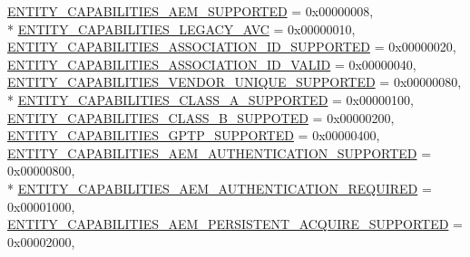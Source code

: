\begin{DoxyCompactItemize}
\hyperlink{namespaceavdecc__lib_a7904f1f7ce9b1358c7158a9dffc7319daa18e66b7496ce73e2596d8f30bb18f40}{E\+N\+T\+I\+T\+Y\+\_\+\+C\+A\+P\+A\+B\+I\+L\+I\+T\+I\+E\+S\+\_\+\+A\+E\+M\+\_\+\+S\+U\+P\+P\+O\+R\+T\+ED} = 0x00000008, 
\\*
\hyperlink{namespaceavdecc__lib_a7904f1f7ce9b1358c7158a9dffc7319da9e2a4da4fdfc17e2be0dd7a47ee6eb32}{E\+N\+T\+I\+T\+Y\+\_\+\+C\+A\+P\+A\+B\+I\+L\+I\+T\+I\+E\+S\+\_\+\+L\+E\+G\+A\+C\+Y\+\_\+\+A\+VC} = 0x00000010, 
\hyperlink{namespaceavdecc__lib_a7904f1f7ce9b1358c7158a9dffc7319daa1ed17e931a0b1bbd2b58ed8a952bb73}{E\+N\+T\+I\+T\+Y\+\_\+\+C\+A\+P\+A\+B\+I\+L\+I\+T\+I\+E\+S\+\_\+\+A\+S\+S\+O\+C\+I\+A\+T\+I\+O\+N\+\_\+\+I\+D\+\_\+\+S\+U\+P\+P\+O\+R\+T\+ED} = 0x00000020, 
\hyperlink{namespaceavdecc__lib_a7904f1f7ce9b1358c7158a9dffc7319daec978ed46b2558f86a7f6e0d454f73c0}{E\+N\+T\+I\+T\+Y\+\_\+\+C\+A\+P\+A\+B\+I\+L\+I\+T\+I\+E\+S\+\_\+\+A\+S\+S\+O\+C\+I\+A\+T\+I\+O\+N\+\_\+\+I\+D\+\_\+\+V\+A\+L\+ID} = 0x00000040, 
\hyperlink{namespaceavdecc__lib_a7904f1f7ce9b1358c7158a9dffc7319da0390d60ea314baff9475942ba1c800e7}{E\+N\+T\+I\+T\+Y\+\_\+\+C\+A\+P\+A\+B\+I\+L\+I\+T\+I\+E\+S\+\_\+\+V\+E\+N\+D\+O\+R\+\_\+\+U\+N\+I\+Q\+U\+E\+\_\+\+S\+U\+P\+P\+O\+R\+T\+ED} = 0x00000080, 
\\*
\hyperlink{namespaceavdecc__lib_a7904f1f7ce9b1358c7158a9dffc7319da9ce10f1cf342140a0bf78429a943abf9}{E\+N\+T\+I\+T\+Y\+\_\+\+C\+A\+P\+A\+B\+I\+L\+I\+T\+I\+E\+S\+\_\+\+C\+L\+A\+S\+S\+\_\+\+A\+\_\+\+S\+U\+P\+P\+O\+R\+T\+ED} = 0x00000100, 
\hyperlink{namespaceavdecc__lib_a7904f1f7ce9b1358c7158a9dffc7319dade0febcf21837d36c15978870251ab8f}{E\+N\+T\+I\+T\+Y\+\_\+\+C\+A\+P\+A\+B\+I\+L\+I\+T\+I\+E\+S\+\_\+\+C\+L\+A\+S\+S\+\_\+\+B\+\_\+\+S\+U\+P\+P\+O\+T\+ED} = 0x00000200, 
\hyperlink{namespaceavdecc__lib_a7904f1f7ce9b1358c7158a9dffc7319da8d1d2cc7b15422d1d05335b60e5bd88b}{E\+N\+T\+I\+T\+Y\+\_\+\+C\+A\+P\+A\+B\+I\+L\+I\+T\+I\+E\+S\+\_\+\+G\+P\+T\+P\+\_\+\+S\+U\+P\+P\+O\+R\+T\+ED} = 0x00000400, 
\hyperlink{namespaceavdecc__lib_a7904f1f7ce9b1358c7158a9dffc7319da940c7f5ab8c14b91e9af3e62f749029d}{E\+N\+T\+I\+T\+Y\+\_\+\+C\+A\+P\+A\+B\+I\+L\+I\+T\+I\+E\+S\+\_\+\+A\+E\+M\+\_\+\+A\+U\+T\+H\+E\+N\+T\+I\+C\+A\+T\+I\+O\+N\+\_\+\+S\+U\+P\+P\+O\+R\+T\+ED} = 0x00000800, 
\\*
\hyperlink{namespaceavdecc__lib_a7904f1f7ce9b1358c7158a9dffc7319da5da99877f8bb8157ac0734acb3e80da3}{E\+N\+T\+I\+T\+Y\+\_\+\+C\+A\+P\+A\+B\+I\+L\+I\+T\+I\+E\+S\+\_\+\+A\+E\+M\+\_\+\+A\+U\+T\+H\+E\+N\+T\+I\+C\+A\+T\+I\+O\+N\+\_\+\+R\+E\+Q\+U\+I\+R\+ED} = 0x00001000, 
\hyperlink{namespaceavdecc__lib_a7904f1f7ce9b1358c7158a9dffc7319da708f8d86407621915384b32c820fd228}{E\+N\+T\+I\+T\+Y\+\_\+\+C\+A\+P\+A\+B\+I\+L\+I\+T\+I\+E\+S\+\_\+\+A\+E\+M\+\_\+\+P\+E\+R\+S\+I\+S\+T\+E\+N\+T\+\_\+\+A\+C\+Q\+U\+I\+R\+E\+\_\+\+S\+U\+P\+P\+O\+R\+T\+ED} = 0x00002000, 

\end{DoxyCompactItemize}
